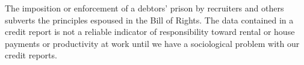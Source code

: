 

The imposition or enforcement of a debtors' prison by recruiters and
others subverts the principles espoused in the Bill of Rights.  The
data contained in a credit report is not a reliable indicator of
responsibility toward rental or house payments or productivity at work
until we have a sociological problem with our credit reports.

\bye
